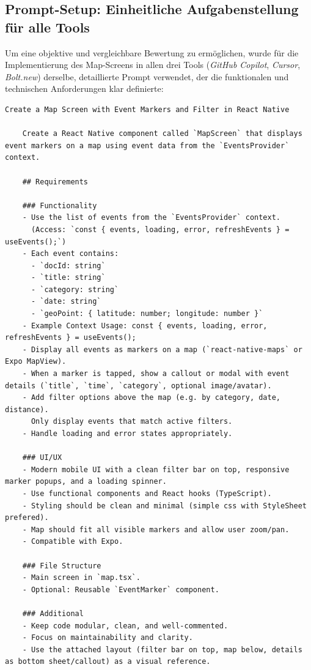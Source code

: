 \subsection{Prompt-Setup: Einheitliche Aufgabenstellung für alle Tools}
\label{sec:prompt-setup}

Um eine objektive und vergleichbare Bewertung zu ermöglichen, wurde für die
Implementierung des Map-Screens in allen drei Tools (\textit{GitHub Copilot},
\textit{Cursor}, \textit{Bolt.new}) derselbe, detaillierte Prompt verwendet,
der die funktionalen und technischen Anforderungen klar definierte:

\begin{lstlisting}[]
    Create a Map Screen with Event Markers and Filter in React Native
    
    Create a React Native component called `MapScreen` that displays event markers on a map using event data from the `EventsProvider` context.
    
    ## Requirements
    
    ### Functionality
    - Use the list of events from the `EventsProvider` context.  
      (Access: `const { events, loading, error, refreshEvents } = useEvents();`)
    - Each event contains:
      - `docId: string`
      - `title: string`
      - `category: string`
      - `date: string`
      - `geoPoint: { latitude: number; longitude: number }`
    - Example Context Usage: const { events, loading, error, refreshEvents } = useEvents();
    - Display all events as markers on a map (`react-native-maps` or Expo MapView).
    - When a marker is tapped, show a callout or modal with event details (`title`, `time`, `category`, optional image/avatar).
    - Add filter options above the map (e.g. by category, date, distance).  
      Only display events that match active filters.
    - Handle loading and error states appropriately.
    
    ### UI/UX
    - Modern mobile UI with a clean filter bar on top, responsive marker popups, and a loading spinner.
    - Use functional components and React hooks (TypeScript).
    - Styling should be clean and minimal (simple css with StyleSheet prefered).
    - Map should fit all visible markers and allow user zoom/pan.
    - Compatible with Expo.
    
    ### File Structure
    - Main screen in `map.tsx`.
    - Optional: Reusable `EventMarker` component.
    
    ### Additional
    - Keep code modular, clean, and well-commented.
    - Focus on maintainability and clarity.
    - Use the attached layout (filter bar on top, map below, details as bottom sheet/callout) as a visual reference.
    

\end{lstlisting}
